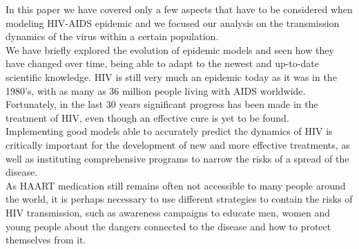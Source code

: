 In this paper we have covered only a few aspects that have to be considered when modeling HIV-AIDS epidemic and we focused our analysis on the transmission dynamics of the virus within a certain population.\\
We have briefly explored the evolution of epidemic models and seen how they have changed over time, being able to adapt to the newest and up-to-date scientific knowledge. HIV is still very much an epidemic today as it was in the 1980's, with as many as 36 million people living with AIDS worldwide. Fortunately, in the last 30 years significant progress has been made in the treatment of HIV, even though an effective cure is yet to be found.\\
Implementing good models able to accurately predict the dynamics of HIV is critically important for the development of new and more effective treatments, as well as instituting comprehensive programs to narrow the risks of a spread of the disease.\\
As HAART medication still remains often not accessible to many people around the world, it is perhaps necessary to use different strategies to contain the risks of HIV transmission, such as awareness campaigns to educate men, women and young people about the dangers connected to the disease and how to protect themselves from it.\\ 
